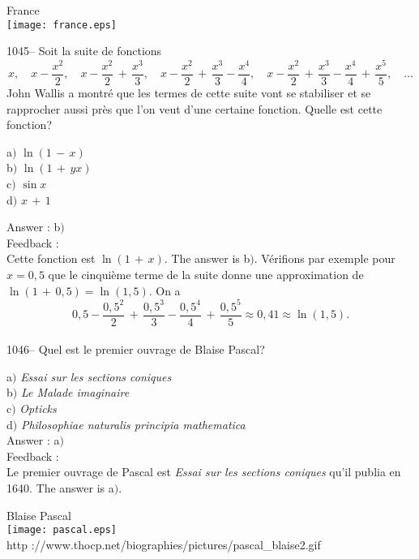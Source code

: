\documentclass[letterpaper, 12pt]{article}
\begin{document}
        \begin{center}
        France\\
    \texttt{[image: france.eps]}\\
    \end{center}

1045-- Soit la suite de fonctions
$$\displaystyle{x,\quad x-\frac{x^2}2,\quad
x-\frac{x^2}2\,+\,\frac{x^3}3,\quad
x-\frac{x^2}2\,+\,\frac{x^3}3-\frac{x^4}4,\quad
x-\frac{x^2}2\,+\,\frac{x^3}3-\frac{x^4}4\,+\,\frac{x^5}5,\quad\ldots}$$
John Wallis a montr\'e que les termes de cette suite vont se
stabiliser et se rapprocher aussi pr\`es que l'on veut d'une
certaine fonction. Quelle est cette fonction?

a$)$ $\ln(1\,-\,x)$ \\
b$)$ $\ln(1\,+\,yx)$  \\
c$)$ $\sin x$  \\
d$)$ $x\,+\,1$

Answer : b$)$\\

Feedback : \\
Cette fonction est $\ln(1\,+\,x)$. The answer is b$)$.
V\'erifions par exemple pour $x=0,5$ que le cinqui\`eme terme de la
suite donne une approximation de $\ln(1\,+\,0,5)=\ln(1,5)$. On a
$$0,5-\frac{0,5^2}2\,+\,\frac{0,5^3}3-\frac{0,5^4}4\,+\,\frac{0,5^5}5\approx0,41\approx\ln(1,5).$$
\\

1046-- Quel est le premier ouvrage de Blaise Pascal?

a$)$ {\sl Essai sur les sections coniques} \\
b$)$ {\sl Le Malade imaginaire}  \\
c$)$ {\sl Opticks}  \\
d$)$ {\sl Philosophiae naturalis principia mathematica}\\

Answer : a$)$\\

Feedback : \\
Le premier ouvrage de Pascal est {\sl Essai sur les sections
coniques} qu'il publia en 1640. The answer is a$)$.

        \begin{center}
        Blaise Pascal\\
    \texttt{[image: pascal.eps]}\\
        {\footnotesize http
://www.thocp.net/biographies/pictures/pascal\_blaise2.gif}
    \end{center}
\end{document}
